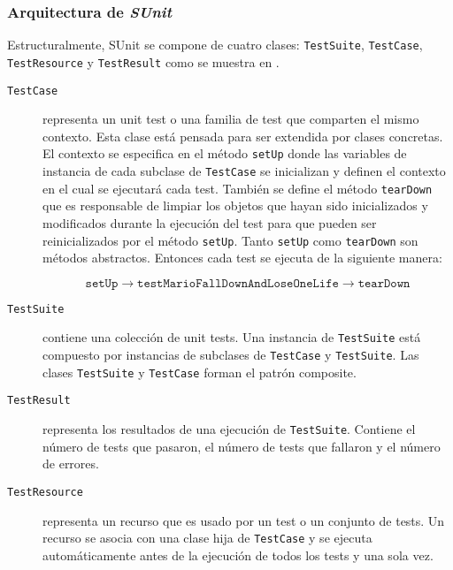 \subsubsection{Arquitectura de \emph{SUnit}}
\par Estructuralmente, SUnit se compone de cuatro clases: {\tt TestSuite}, {\tt TestCase}, {\tt TestResource} y {\tt TestResult} como se muestra en . 
\begin{description}
\item[{\tt TestCase}] representa un unit test o una familia de test que comparten el mismo contexto. Esta clase está pensada para ser extendida por clases concretas. El contexto se especifica en el método {\tt setUp} donde las variables de instancia de cada subclase de {\tt TestCase} se inicializan y definen el contexto en el cual se ejecutará cada test. También se define el método {\tt tearDown} que es responsable de limpiar los objetos que hayan sido inicializados y modificados durante la ejecución del test para que pueden ser reinicializados por el método {\tt setUp}. Tanto {\tt setUp} como {\tt tearDown} son métodos abstractos. Entonces cada test se ejecuta de la siguiente manera:

\[ \texttt{setUp} \rightarrow \texttt{testMarioFallDownAndLoseOneLife} \rightarrow \texttt{tearDown} \]

\item[{\tt TestSuite}] contiene una colección de unit tests. Una instancia de {\tt TestSuite} está compuesto por instancias de subclases de {\tt TestCase} y {\tt TestSuite}. Las clases {\tt TestSuite} y {\tt TestCase} forman el patrón composite. 

\item[{\tt TestResult}] representa los resultados de una ejecución de {\tt TestSuite}. Contiene el número de tests que pasaron, el número de tests que fallaron y el número de errores.

\item[{\tt TestResource}] representa un recurso que es usado por un test o un conjunto de tests. Un recurso se asocia con una clase hija de {\tt TestCase} y se ejecuta automáticamente antes de la ejecución de todos los tests y una sola vez.   
\end{description}


